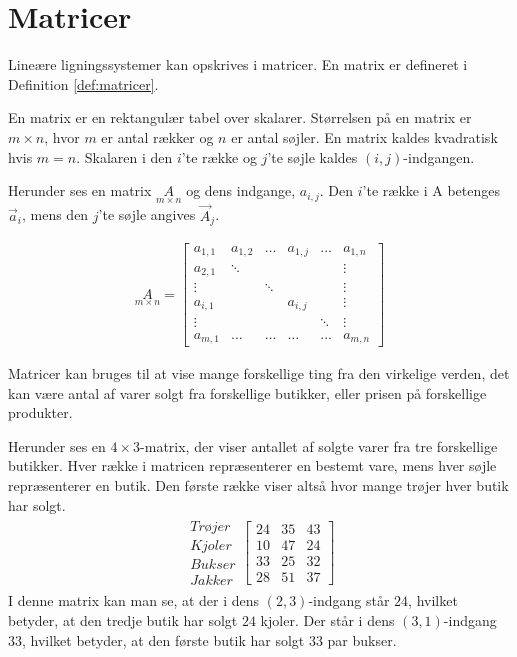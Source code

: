 \section{Matricer}
Lineære ligningssystemer kan opskrives i matricer. 
En matrix er defineret i Definition \ref{def:matricer}.

\begin{defn} [Matrix]
En matrix er en rektangulær tabel over skalarer. 
Størrelsen på en matrix er $m \times n$, hvor $m$ er antal rækker og $n$ er antal søjler. 
En matrix kaldes kvadratisk hvis $m=n$. 
Skalaren i den $i$'te række og $j$'te søjle kaldes $(i,j)$-indgangen.
\label{def:matricer}
\end{defn}

Herunder ses en matrix $\underset{m \times n}{A}$ og dens indgange, $a_{i,j}$. Den $i$'te række i A betenges $\vec{a}_i$, mens den $j$'te søjle angives $\vec{A}_j$.

\begin{align*}
\underset{m \times n}{A} = \begin{bmatrix}
	a_{1,1} & a_{1,2} & \dots & a_{1,j} & \dots & a_{1,n} \\
	a_{2,1} & \ddots  &       &         &       & \vdots \\
	\vdots  &         & \ddots &        &       & \vdots \\
	a_{i,1} &         &       & a_{i,j} &       & \vdots \\
	\vdots  &         &       &         & \ddots& \vdots \\
	a_{m,1} & \dots   & \dots & \dots   & \dots & a_{m,n} 
\end{bmatrix}
\end{align*}

Matricer kan bruges til at vise mange forskellige ting fra den virkelige verden, det kan være antal af varer solgt fra forskellige butikker, eller prisen på forskellige produkter. 

\begin{eks}
Herunder ses en $4 \times 3$-matrix, der viser antallet af solgte varer fra tre forskellige butikker. Hver række i matricen repræsenterer en bestemt vare, mens hver søjle repræsenterer en butik. Den første række viser altså hvor mange trøjer hver butik har solgt.
\begin{align*}
\begin{matrix}
	Trøjer \\
	Kjoler \\
	Bukser \\
	Jakker
\end{matrix}
\begin{bmatrix}
	24 & 35 & 43 \\
	10 & 47 & 24 \\
	33 & 25 & 32 \\
	28 & 51 & 37
\end{bmatrix}
\end{align*}
I denne matrix kan man se, at der i dens $(2,3)$-indgang står $24$, hvilket betyder, at den tredje butik har solgt $24$ kjoler. Der står i dens $(3,1)$-indgang $33$, hvilket betyder, at den første butik har solgt $33$ par bukser.
\end{eks}

